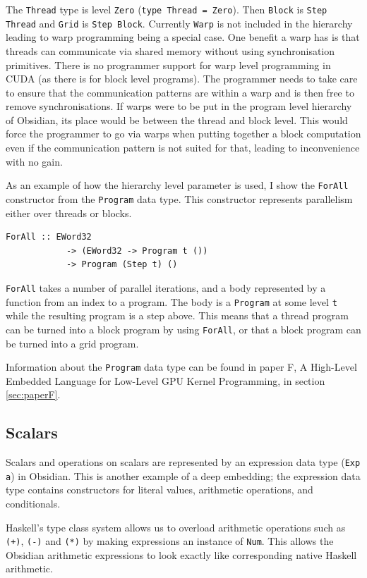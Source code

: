 \documentclass[a4paper]{book}
\newcommand{\paperFTitle}{A High-Level Embedded Language for Low-Level GPU Kernel Programming}
\begin{document}
The {\tt Thread} type is level {\tt Zero} ({\tt type Thread = Zero}). Then {\tt Block} is 
{\tt Step Thread} and {\tt Grid} is {\tt Step Block}. Currently {\tt Warp} is not included 
in the hierarchy leading to warp programming being a special case. One benefit a warp has is 
that threads can communicate via shared memory without using synchronisation primitives. There 
is no programmer support for warp level programming in CUDA (as there is for block level 
programs). The programmer needs to take care to ensure that the communication patterns are 
within a warp and is then free to remove synchronisations. If warps were to be put in the 
program level hierarchy of Obsidian, its place would be between the thread and block level. 
This would force the programmer to go via warps when putting together a block computation even 
if the communication pattern is not suited for that, leading to inconvenience with no gain. 

As an example of how the hierarchy level parameter is used, I show the {\tt ForAll} constructor 
from the {\tt Program} data type.  This constructor represents parallelism either over threads 
or blocks. 

\begin{verbatim}
ForAll :: EWord32 
            -> (EWord32 -> Program t ())
            -> Program (Step t) ()
\end{verbatim}

{\tt ForAll} takes a number of parallel iterations, and a body represented by a function 
from an index to a program. The body is a {\tt Program} at some level {\tt t} while the 
resulting program is a step above. This means that a thread program can be turned into 
a block program by using {\tt ForAll}, or that a block program can be turned into a grid program. 

Information about the {\tt Program} data type can be found in paper F, \paperFTitle, in 
section \ref{sec:paperF}. 

\subsection{Scalars} 

Scalars and operations on scalars are represented by an expression data type ({\tt Exp a}) in 
Obsidian. This is another example of a deep embedding; the expression data type contains 
constructors for literal values, arithmetic operations, and conditionals. 

Haskell's type class system allows us to overload arithmetic operations such as {\tt (+)}, 
{\tt (-)} and {\tt (*)} by making expressions an instance of {\tt Num}. This allows the 
Obsidian arithmetic expressions to look exactly like corresponding native Haskell arithmetic. 
\end{document}
